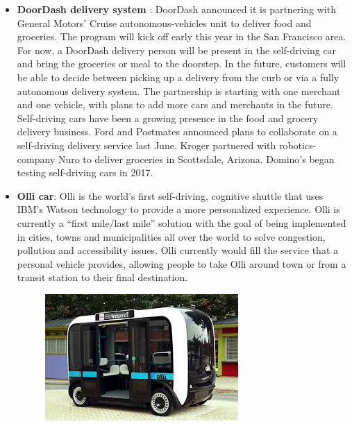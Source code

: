 \begin{itemize}
\item\textbf{DoorDash delivery system }:
DoorDash announced it is partnering with General Motors' Cruise autonomous-vehicles unit to deliver food and groceries. The program will kick off early this year in the San Francisco area.
For now, a DoorDash delivery person will be present in the self-driving car and bring the groceries or meal to the doorstep. In the future, customers will be able to decide between picking up a delivery from the curb or via a fully autonomous delivery system.
The partnership is starting with one merchant and one vehicle, with plans to add more cars and merchants in the future.
Self-driving cars have been a growing presence in the food and grocery delivery business. Ford and Postmates announced plans to collaborate on a self-driving delivery service last June. Kroger partnered with robotics-company Nuro to deliver groceries in Scottsdale, Arizona. Domino's began testing self-driving cars in 2017.\cite{web031}

\par
\item\textbf{Olli car}: Olli is the world’s first self-driving, cognitive shuttle that uses IBM’s Watson technology to provide a more personalized experience. Olli is currently a “first mile/last mile” solution with the goal of being implemented in cities, towns and municipalities all over the world to solve congestion, pollution and accessibility issues. Olli currently would fill the service that a personal vehicle provides, allowing people to take Olli around town or from a transit station to their final destination.\cite{web032}

\begin{figure}[H]%
    \center%
    \includegraphics[width=.5\textwidth]{images/Alaa/olli.jpg}%
  \end{figure}
\end{itemize}


